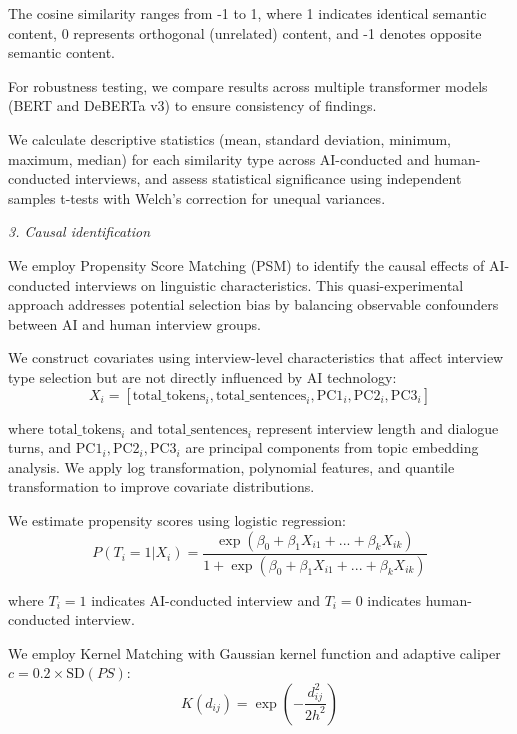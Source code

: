 \documentclass[sigchi,nonacm,manuscript]{acmart}
\begin{document}
The cosine similarity ranges from -1 to 1, where 1 indicates identical semantic content, 0 represents orthogonal (unrelated) content, and -1 denotes opposite semantic content.

For robustness testing, we compare results across multiple transformer models (BERT and DeBERTa v3) to ensure consistency of findings.

We calculate descriptive statistics (mean, standard deviation, minimum, maximum, median) for each similarity type across AI-conducted and human-conducted interviews, and assess statistical significance using independent samples t-tests with Welch's correction for unequal variances.

\textit{3. Causal identification}

We employ Propensity Score Matching (PSM) to identify the causal effects of AI-conducted interviews on linguistic characteristics. This quasi-experimental approach addresses potential selection bias by balancing observable confounders between AI and human interview groups.

We construct covariates using interview-level characteristics that affect interview type selection but are not directly influenced by AI technology:
\begin{equation}
X_i = [\text{total\_tokens}_i, \text{total\_sentences}_i, \text{PC1}_i, \text{PC2}_i, \text{PC3}_i]
\end{equation}

where $\text{total\_tokens}_i$ and $\text{total\_sentences}_i$ represent interview length and dialogue turns, and $\text{PC1}_i, \text{PC2}_i, \text{PC3}_i$ are principal components from topic embedding analysis. We apply log transformation, polynomial features, and quantile transformation to improve covariate distributions.

We estimate propensity scores using logistic regression:
\begin{equation}
P(T_i = 1 | X_i) = \frac{\exp(\beta_0 + \beta_1 X_{i1} + ... + \beta_k X_{ik})}{1 + \exp(\beta_0 + \beta_1 X_{i1} + ... + \beta_k X_{ik})}
\end{equation}

where $T_i = 1$ indicates AI-conducted interview and $T_i = 0$ indicates human-conducted interview.

We employ Kernel Matching with Gaussian kernel function and adaptive caliper $c = 0.2 \times \text{SD}(PS)$:
\begin{equation}
K(d_{ij}) = \exp\left(-\frac{d_{ij}^2}{2h^2}\right)
\end{equation}
\end{document}
